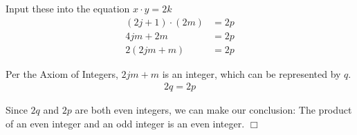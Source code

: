 \documentclass{article}
\begin{document}
\begin{itemize}
    \hspace*{0.5cm}Input these into the equation $x\cdot y=2k$
    \begin{align}
        (2j+1)\cdot(2m)&=2p\nonumber\\
        4jm+2m&=2p\nonumber\\
        2(2jm+m)&=2p\nonumber
    \end{align}
    
    \hspace*{0.5cm}Per the Axiom of Integers, $2jm+m$ is an integer, which can be represented by $q$.
    \begin{align}
        2q=2p\nonumber
    \end{align}
    
    \noindent
    \hspace*{0.5cm}Since $2q$ and $2p$ are both even integers, we can make our conclusion: The product of an even integer and \hspace*{0.5cm}an odd integer is an even integer. $\Box$
\end{itemize}
\end{document}
